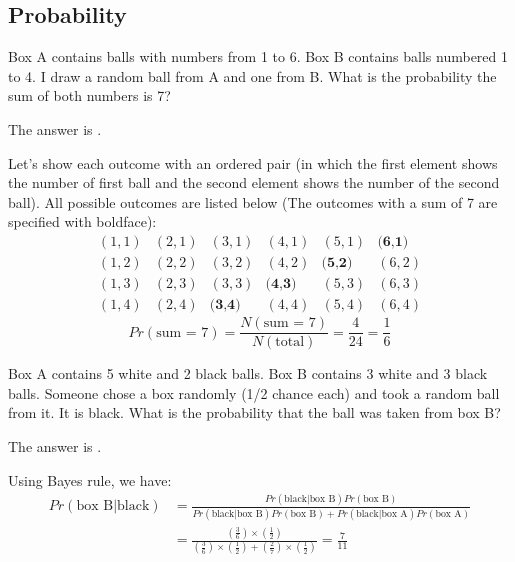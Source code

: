 \subsection*{Probability}

\begin{question}
Box A contains balls with numbers from 1 to 6.  Box B contains balls numbered 1 to 4.   I draw a random ball from A and one from B.  What is the probability the sum of both numbers is 7?
\begin{solution}
The answer is .
\end{solution}
Let's show each outcome with an ordered pair (in which the first element shows the number of first ball and the second element shows the number of the second ball). All possible outcomes are listed below (The outcomes with a sum of 7 are specified with boldface):
\[
\begin{matrix}
(1,1) & (2,1) & (3,1) & (4,1) & (5,1) & \textbf{(6,1)} \\
(1,2) & (2,2) & (3,2) & (4,2) & \textbf{(5,2)} & (6,2) \\
(1,3) & (2,3) & (3,3) & \textbf{(4,3)} & (5,3) & (6,3) \\
(1,4) & (2,4) & \textbf{(3,4)} & (4,4) & (5,4) & (6,4)
\end{matrix}
\]
\[
Pr (\text{sum = 7}) = \frac{N(\text{sum = 7})}{N(\text{total})} = \frac{4}{24} = \frac{1}{6}
\]
\end{question}

\begin{question}
Box A contains 5 white and 2 black balls.   Box B contains 3 white and 3 black balls.  Someone chose a box randomly (1/2 chance each) and took a random ball from it.  It is black.  What is the probability that the ball was taken from box B?
\begin{solution}
The answer is .
\end{solution}
Using Bayes rule, we have:
\begin{align*}
Pr (\text{box B} | \text{black}) &= \frac{Pr(\text{black} | \text{box B}) Pr(\text{box B})}{Pr(\text{black} | \text{box B}) Pr(\text{box B}) + Pr(\text{black} | \text{box A}) Pr(\text{box A})} \\
&=\frac{(\frac{3}{6}) \times (\frac{1}{2})}{(\frac{3}{6}) \times (\frac{1}{2}) + (\frac{2}{7}) \times (\frac{1}{2})} = \frac{7}{11}
\end{align*}
\end{question}

